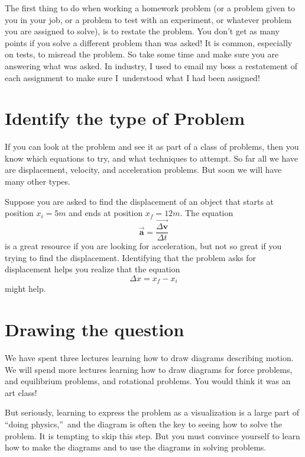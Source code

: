\documentclass[]{Book}
\begin{document}
The first thing to do when working a homework problem (or a problem given to
you in your job, or a problem to test with an experiment, or whatever
problem you are assigned to solve), is to restate the problem. You don't get
as many points if you solve a different problem than was asked! It is
common, especially on tests, to misread the problem. So take some time and
make sure you are answering what was asked. In industry, I used to email my
boss a restatement of each assignment to make sure I\ understood what I had
been assigned!

\section{Identify the type of Problem}

If you can look at the problem and see it as part of a class of problems,
then you know which equations to try, and what techniques to attempt. So far
all we have are displacement, velocity, and acceleration problems. But soon
we will have many other types.

Suppose you are asked to find the displacement of an object that starts at
position $x_{i}=5\unit{m}$ and ends at position $x_{f}=12\unit{m}.$ The
equation 
\begin{equation*}
	\overrightarrow{\mathbf{a}}=\frac{\overrightarrow{\Delta \mathbf{v}}}{\Delta
		t}
\end{equation*}%
is a great resource if you are looking for acceleration, but not so great if
you trying to find the displacement. Identifying that the problem asks for
displacement helps you realize that the equation 
\begin{equation*}
	\Delta x=x_{f}-x_{i}
\end{equation*}%
might help.

\section{Drawing the question}

We have spent three lectures learning how to draw diagrams describing
motion. We will spend more lectures learning how to draw diagrams for force
problems, and equilibrium problems, and rotational problems. You would think
it was an art class!

But seriously, learning to express the problem as a visualization is a large
part of \textquotedblleft doing physics,\textquotedblright\ and the diagram
is often the key to seeing how to solve the problem. It is tempting to skip
this step. But you must convince yourself to learn how to make the diagrams
and to use the diagrams in solving problems.
\end{document}
